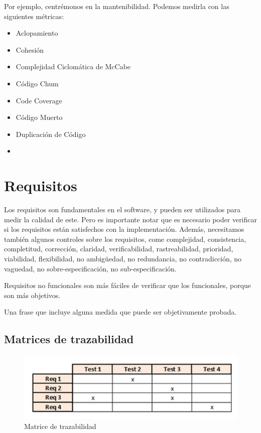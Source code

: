 Por ejemplo, centrémonos en la mantenibilidad. Podemos medirla con las siguientes métricas:
\begin{itemize}
   \item Aclopamiento
   \item Cohesión
   \item Complejidad Ciclomática de McCabe
   \item Código Chum
   \item Code Coverage
   \item Código Muerto
   \item Duplicación de Código
   \item 
\end{itemize}


\section{Requisitos}
Los requisitos son fundamentales en el software, y pueden ser utilizados para medir la calidad de este. 
Pero es importante notar que es necesario poder verificar si los requisitos están satisfechos con la implementación.
Además, necesitamos también algunos controles sobre los requisitos, come complejidad, consistencia, completitud, corrección, claridad, verificabilidad, rastreabilidad, prioridad, viabilidad, flexibilidad, no ambigüedad, no redundancia, no contradicción, no vaguedad, no sobre-especificación, no sub-especificación.

Requisitos no funcionales son más fáciles de verificar que los funcionales, porque son más objetivos.
\begin{definition}
   Una frase que incluye alguna medida que puede ser objetivamente probada.
\end{definition}

\subsection{Matrices de trazabilidad}

\begin{figure}[htbp]
   \centering
   \includegraphics{images/01/matriceTrazabilidad.png}
   \caption{Matrice de trazabilidad}
   \label{fig:01/matriceTrazabilidad}
\end{figure}

